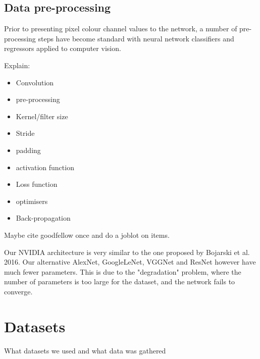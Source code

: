 \subsection{Data pre-processing}
Prior to presenting pixel colour channel values to the network, a number of pre-processing steps have become standard with neural network classifiers and regressors applied to computer vision.


Explain:  
\begin{itemize}
    \item Convolution
    \item pre-processing
    \item Kernel/filter size
    \item Stride
    \item padding
    \item activation function
    \item Loss function
    \item optimisers
    \item Back-propagation
\end{itemize}

Maybe cite goodfellow once and do a joblot on items.  

Our NVIDIA architecture is very similar to the one proposed by Bojarski et al. 2016. Our alternative AlexNet, GoogleLeNet, VGGNet and ResNet however have much fewer parameters. This is due to the "degradation" problem, where the number of parameters is too large for the dataset, and the network fails to converge.

\section{Datasets}
What datasets we used and what data was gathered

